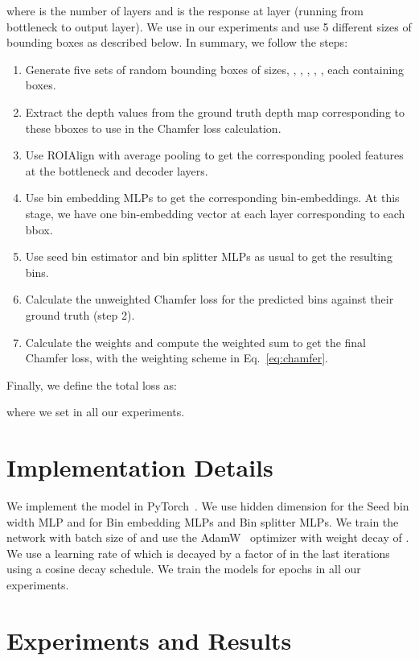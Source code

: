 \documentclass[runningheads]{llncs}
\begin{document}
where  is the number of layers and  is the response at layer  (running from bottleneck to output layer). We use  in our experiments and use 5 different sizes of bounding boxes as described below. In summary, we follow the steps: 
\begin{enumerate}
    \item Generate five sets of random bounding boxes of sizes, , , , , , each containing  boxes.
    \item Extract the depth values from the ground truth depth map corresponding to these bboxes to use in the Chamfer loss calculation.
    \item Use ROIAlign with average pooling to get the corresponding pooled features at the bottleneck and decoder layers.
    \item Use bin embedding MLPs to get the corresponding bin-embeddings. At this stage, we have one bin-embedding vector at each layer corresponding to each bbox.
    \item Use seed bin estimator and bin splitter MLPs as usual to get the resulting bins.
    \item Calculate the unweighted Chamfer loss for the predicted bins against their ground truth (step 2).
    \item Calculate the weights and compute the weighted sum to get the final Chamfer loss, with the weighting scheme in Eq.~\ref{eq:chamfer}.
\end{enumerate}


Finally, we define the total loss as:

where we set  in all our experiments.






\section{Implementation Details}
We implement the model in PyTorch~\cite{NEURIPS2019_bdbca288}. We use hidden dimension  for the Seed bin width MLP and  for Bin embedding MLPs and Bin splitter MLPs. We train the network with batch size of  and use the AdamW~\cite{LoshchilovH19} optimizer with weight decay of . We use a learning rate of  which is decayed by a factor of  in the last  iterations using a cosine decay schedule. We train the models for  epochs in all our experiments.

\section{Experiments and Results}
\end{document}
